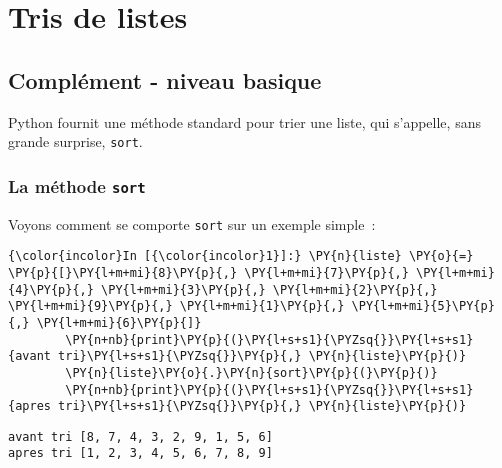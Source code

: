     
    
    
    

    

    \hypertarget{tris-de-listes}{%
\section{Tris de listes}\label{tris-de-listes}}

    \hypertarget{compluxe9ment---niveau-basique}{%
\subsection{Complément - niveau
basique}\label{compluxe9ment---niveau-basique}}

    Python fournit une méthode standard pour trier une liste, qui s'appelle,
sans grande surprise, \texttt{sort}.

    \hypertarget{la-muxe9thode-sort}{%
\subsubsection{\texorpdfstring{La méthode
\texttt{sort}}{La méthode sort}}\label{la-muxe9thode-sort}}

    Voyons comment se comporte \texttt{sort} sur un exemple simple~:

    \begin{Verbatim}[commandchars=\\\{\},frame=single,framerule=0.3mm,rulecolor=\color{cellframecolor}]
{\color{incolor}In [{\color{incolor}1}]:} \PY{n}{liste} \PY{o}{=} \PY{p}{[}\PY{l+m+mi}{8}\PY{p}{,} \PY{l+m+mi}{7}\PY{p}{,} \PY{l+m+mi}{4}\PY{p}{,} \PY{l+m+mi}{3}\PY{p}{,} \PY{l+m+mi}{2}\PY{p}{,} \PY{l+m+mi}{9}\PY{p}{,} \PY{l+m+mi}{1}\PY{p}{,} \PY{l+m+mi}{5}\PY{p}{,} \PY{l+m+mi}{6}\PY{p}{]}
        \PY{n+nb}{print}\PY{p}{(}\PY{l+s+s1}{\PYZsq{}}\PY{l+s+s1}{avant tri}\PY{l+s+s1}{\PYZsq{}}\PY{p}{,} \PY{n}{liste}\PY{p}{)}
        \PY{n}{liste}\PY{o}{.}\PY{n}{sort}\PY{p}{(}\PY{p}{)}
        \PY{n+nb}{print}\PY{p}{(}\PY{l+s+s1}{\PYZsq{}}\PY{l+s+s1}{apres tri}\PY{l+s+s1}{\PYZsq{}}\PY{p}{,} \PY{n}{liste}\PY{p}{)}
\end{Verbatim}


    \begin{Verbatim}[commandchars=\\\{\},frame=single,framerule=0.3mm,rulecolor=\color{cellframecolor}]
avant tri [8, 7, 4, 3, 2, 9, 1, 5, 6]
apres tri [1, 2, 3, 4, 5, 6, 7, 8, 9]
\end{Verbatim}

